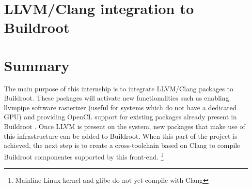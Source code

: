 \documentclass[12pt,a4paper,oneside]{article}
\begin{document}
\newpage
\section{LLVM/Clang integration to Buildroot}

\section*{Summary}
The main purpose of this internship is to integrate LLVM/Clang packages to Buildroot.
These packages will activate new functionalities such as enabling llvmpipe software
rasterizer (useful for systems which do not have a dedicated GPU) and providing OpenCL
support for existing packages already present in Buildroot . Once LLVM is present
on the system, new packages that make use of this infrastructure can be added to
Buildroot. When this part of the project is achieved, the next step is to create
a cross-toolchain based on Clang to compile Buildroot componentes supported by
this front-end. \footnote{Mainline Linux kernel and glibc do not yet compile with
Clang}
\end{document}
